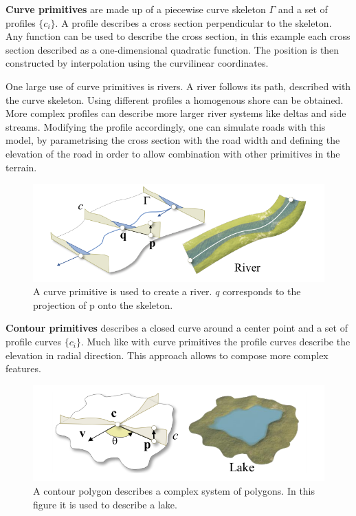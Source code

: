 \textbf{Curve primitives} are made up of a piecewise curve skeleton  $\Gamma$ and a set of profiles $\{c_i\}$. A profile describes a cross section perpendicular to the skeleton. Any function can be used to describe the cross section, in this example each cross section described as a one-dimensional quadratic function. The position is then constructed by interpolation using the curvilinear coordinates. 

One large use of curve primitives is rivers. A river follows its path, described with the curve skeleton. Using different profiles a homogenous shore can be obtained. More complex profiles can describe more larger river systems like deltas and side streams. 
Modifying the profile accordingly, one can simulate roads with this model, by parametrising the cross section with the road width and defining the elevation of the road in order to allow combination with other primitives in the terrain.

\begin{figure}[htb]
	\centering
	\includegraphics[width=.8\linewidth]{GGP15/curve_primitive}
	\caption{A curve primitive is used to create a river. $q$ corresponds to the projection of p onto the skeleton.}
	\label{fig:curve_primitive}
\end{figure}

\textbf{Contour primitives} describes a closed curve around a center point and a set of profile curves $\{ c_i \}$. Much like with curve primitives the profile curves describe the elevation in radial direction. This approach allows to compose more complex features.

\begin{figure}[htb]
	\centering
	\includegraphics[width=.8\linewidth]{GGP15/contour_primitive}
	\caption{A contour polygon describes a complex system of polygons. In this figure it is used to describe a lake.}
	\label{fig:contour_primitive}
\end{figure}

